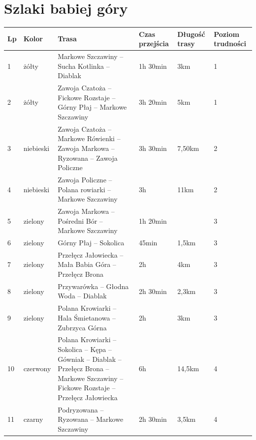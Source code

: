 \documentclass[a4paper,12pt]{article}
\begin{document}
\section{Szlaki babiej góry}
\begin{center}
    \begin{longtable}{ | l | l | p{5cm} | l | l | p{2cm} |}
    \hline
    \textbf{Lp} & \textbf{Kolor} & \textbf{Trasa} & \textbf{Czas przejścia} & \textbf{Długość trasy} & \textbf{Poziom trudności}\\ \hline
    1 & żółty & Markowe Szczawiny -- Sucha Kotlinka -- Diablak & 1h 30min & 3km & 1\\\hline
    2 & żółty & Zawoja Czatoża -- Fickowe Rozstaje -- Górny Płaj -- Markowe
Szczawiny & 3h 20min & 5km & 1\\\hline
	3 & niebieski & Zawoja Czatoża -- Markowe Rówienki -- Zawoja Markowa --Ryzowana -- Zawoja Policzne & 3h 30min & 7,50km & 2\\\hline
	4 & niebieski & Zawoja Policzne -- Polana rowiarki -- Markowe Szczawiny & 3h & 11km & 2\\\hline
	5 & zielony & Zawoja Markowa -- Pośredni Bór -- Markowe Szczawiny & 1h 20min &  & 3\\\hline
	6 & zielony & Górny Płaj -- Sokolica & 45min & 1,5km & 3\\\hline
	7 & zielony & Przełęcz Jałowiecka -- Mała Babia Góra -- Przełęcz Brona & 2h & 4km & 3\\\hline
	8 & zielony & Przywarówka -- Głodna Woda -- Diablak & 2h 30min & 2,3km & 3\\\hline
	9 & zielony & Polana Krowiarki -- Hala Śmietanowa -- Zubrzyca Górna & 2h & 3km & 3\\\hline
	10 & czerwony & Polana Krowiarki -- Sokolica -- Kępa -- Gówniak -- Diablak -- Przełęcz Brona -- Markowe Szczawiny -- Fickowe Rozstaje -- Przełęcz Jałowiecka & 6h & 14,5km & 4\\\hline
	11 & czarny & Podryzowana -- Ryzowana -- Markowe Szczawiny & 2h 30min & 3,5km & 4\\\hline
    \end{longtable}
\end{center}
\newpage
\end{document}
